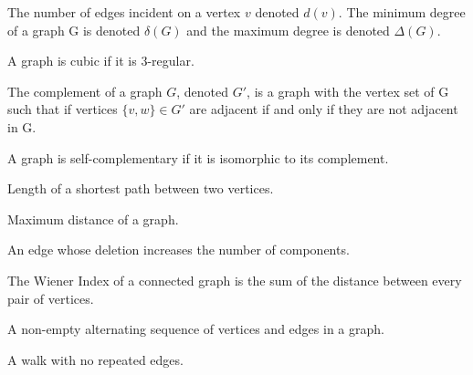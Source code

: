 
\begin{definition}[Degree]
    The number of edges incident on a vertex $v$ denoted $d(v)$. The minimum degree of a graph G is denoted $\delta(G)$ and the maximum degree is denoted $\Delta(G)$.
\end{definition} 

\begin{definition}[Cubic]
    A graph is cubic if it is 3-regular.
\end{definition} 

\begin{definition}[Complement]
    The complement of a graph $G$, denoted $G'$, is a graph with the vertex set of G such that if vertices $\{v,w\}\in G'$ are adjacent if and only if they are not adjacent in G.
\end{definition} 

\begin{definition}
    A graph is self-complementary if it is isomorphic to its complement.
\end{definition} 

\begin{definition}[Distance]
    Length of a shortest path between two vertices.
\end{definition} 

\begin{definition}[Diameter]
    Maximum distance of a graph.
\end{definition} 

\begin{definition}[Bridge]
    An edge whose deletion increases the number of components.
\end{definition} 

\begin{definition}
    The Wiener Index of a connected graph is the sum of the distance between every pair of vertices.
\end{definition} 

\begin{definition}[Walk]
    A non-empty alternating sequence of vertices and edges in a graph.
\end{definition} 

\begin{definition}[Trail]
    A walk with no repeated edges.
\end{definition} 

